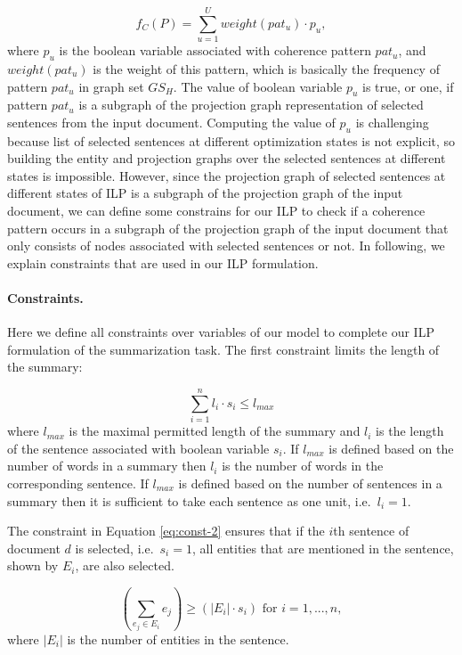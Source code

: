 \begin{equation}
f_C(P) = \sum_{u=1}^{U}{weight(pat_u) \cdot p_u},
\end{equation}
where $p_u$ is the boolean variable associated with coherence pattern $pat_u$, and $weight(pat_u)$ is the weight of this pattern, which is basically the frequency of pattern $pat_u$ in graph set $GS_H$. 
The value of boolean variable $p_u$ is true, or one, if pattern $pat_u$ is a subgraph of the projection graph representation of selected sentences from the input document.  
Computing the value of $p_u$ is challenging because list of selected sentences at different optimization states is not explicit, so building the entity and projection graphs over the selected sentences at different states is impossible. 
However, since the projection graph of selected sentences at different states of ILP is a subgraph of the projection graph of the input document, we can define some constrains for our ILP to check if a coherence pattern occurs in a subgraph of the projection graph of the input document that only consists of nodes associated with selected sentences or not. 
In following, we explain constraints that are used in our ILP formulation. 

\paragraph{Constraints.}
%
Here we define all constraints over variables of our model to complete our ILP formulation of the summarization task. 
The first constraint limits the length of the summary:

\begin{equation}
\sum_{i=1}^{n} l_i \cdot s_i \le l_{max}
\end{equation}
where $l_{max}$ is the maximal permitted length of the summary and $l_i$ is the length of the sentence associated with boolean variable $s_i$.  
If $l_{max}$ is defined based on the number of words in a summary then $l_i$ is the number of words in the corresponding sentence.  
If $l_{max}$ is defined based on the number of sentences in a summary then it is sufficient to take each sentence as one unit, i.e.\ $l_i=1$. 

The constraint in Equation \ref{eq:const-2} ensures that if the $i$th sentence of document $d$ is selected, i.e.\ $s_i = 1$, all entities that are mentioned in the sentence, shown by $E_i$, are also selected. 

\begin{equation}
\label{eq:const-2}
( \sum_{e_j\in E_i}{e_j} )  \ge (|E_i| \cdot s_i) \text{   for   }i = 1,...,n,
\end{equation} 
where $|E_i|$ is the number of entities in the sentence.  


